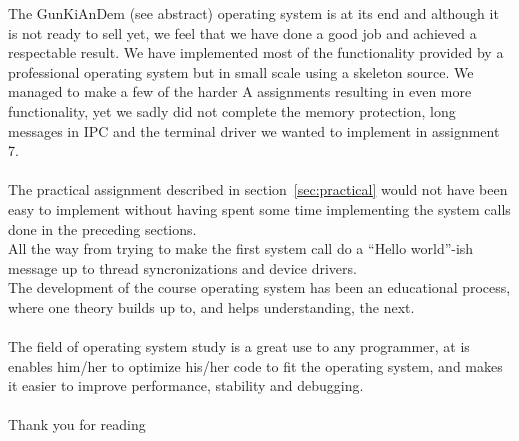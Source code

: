 The GunKiAnDem (see abstract) operating system is at its end and although it is not ready to sell yet, we feel that we have done a good job and achieved a respectable result.
We have implemented most of the functionality provided by a professional operating system but in small scale using a skeleton source. We managed to make a few of the harder A assignments resulting in even more functionality, yet we sadly did not complete the memory protection, long messages in IPC and the terminal driver we wanted to implement in assignment 7.\\
\\
The practical assignment described in section~\ref{sec:practical} would not have been easy to implement without having spent some time implementing the system calls done in the preceding sections.\\
All the way from trying to make the first system call do a ``Hello world''-ish message up to thread syncronizations and device drivers.\\
The development of the course operating system has been an educational process, where one theory builds up to, and helps understanding, the next.\\
\\
The field of operating system study is a great use to any programmer, at is enables him/her to optimize his/her code to fit the operating system, and makes it easier to improve performance, stability and debugging.\\
\\
Thank you for reading
